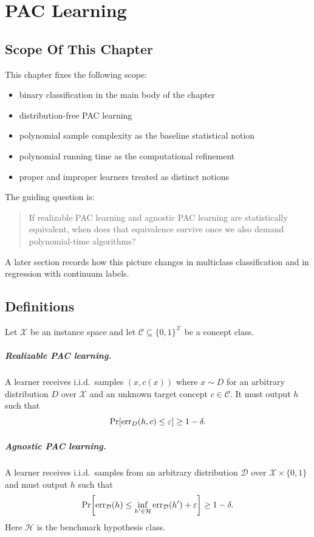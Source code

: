 \chapter{PAC Learning}

\section{Scope Of This Chapter}

This chapter fixes the following scope:

\begin{itemize}
\item binary classification in the main body of the chapter
\item distribution-free PAC learning
\item polynomial sample complexity as the baseline statistical notion
\item polynomial running time as the computational refinement
\item proper and improper learners treated as distinct notions
\end{itemize}

The guiding question is:

\begin{quote}
If realizable PAC learning and agnostic PAC learning are statistically equivalent, when does that equivalence survive once we also demand polynomial-time algorithms?
\end{quote}

A later section records how this picture changes in multiclass classification and in regression with continuum labels.

\section{Definitions}

Let $\mathcal{X}$ be an instance space and let $\mathcal{C} \subseteq \{0,1\}^{\mathcal{X}}$ be a concept class.

\paragraph{Realizable PAC learning.}
A learner receives i.i.d.\ samples $(x,c(x))$ where $x \sim D$ for an arbitrary distribution $D$ over $\mathcal{X}$ and an unknown target concept $c \in \mathcal{C}$. It must output $h$ such that
\[
\Pr\!\left[\operatorname{err}_D(h,c) \le \varepsilon\right] \ge 1-\delta.
\]

\paragraph{Agnostic PAC learning.}
A learner receives i.i.d.\ samples from an arbitrary distribution $\mathcal{D}$ over $\mathcal{X} \times \{0,1\}$ and must output $h$ such that
\[
\Pr\!\left[\operatorname{err}_{\mathcal{D}}(h) \le \inf_{h' \in \mathcal{H}} \operatorname{err}_{\mathcal{D}}(h') + \varepsilon\right] \ge 1-\delta.
\]
Here $\mathcal{H}$ is the benchmark hypothesis class.

